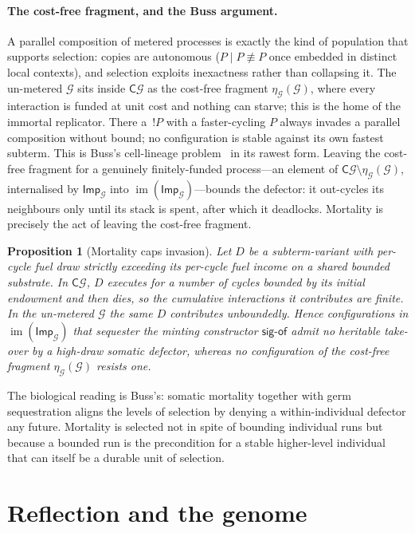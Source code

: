 \documentclass[11pt]{article}
\theoremstyle{plain}
\newtheorem{proposition}{Proposition}
\theoremstyle{definition}
\theoremstyle{remark}
\newcommand{\G}{\mathcal{G}}
\newcommand{\C}{\mathsf{C}}
\newcommand{\sigof}{\mathsf{sig\text{-}of}}
\newcommand{\Imp}{\mathsf{Imp}}
\newcommand{\unit}{\eta}
\begin{document}
\paragraph{The cost-free fragment, and the Buss argument.}
A parallel composition of metered processes is exactly the kind of population
that supports selection: copies are autonomous ($P\mid P\not\equiv P$ once
embedded in distinct local contexts), and selection exploits inexactness rather
than collapsing it. The un-metered $\G$ sits inside $\C\G$ as the cost-free
fragment $\unit_\G(\G)$, where every interaction is funded at unit cost and
nothing can starve; this is the home of the immortal replicator. There a
$\,! P$ with a faster-cycling $P$ always invades a parallel composition without
bound; no configuration is stable against its own fastest subterm. This is
Buss's cell-lineage problem~\cite{buss1987} in its rawest form. Leaving the
cost-free fragment for a genuinely finitely-funded process---an element of
$\C\G\setminus\unit_\G(\G)$, internalised by $\Imp_\G$ into
$\operatorname{im}(\Imp_\G)$---bounds the defector: it out-cycles its neighbours
only until its stack is spent, after which it deadlocks. Mortality is precisely
the act of leaving the cost-free fragment.

\begin{proposition}[Mortality caps invasion]
\label{prop:invasion}
Let $D$ be a subterm-variant with per-cycle fuel draw strictly exceeding its
per-cycle fuel income on a shared bounded substrate. In $\C\G$, $D$ executes for
a number of cycles bounded by its initial endowment and then dies, so the
cumulative interactions it contributes are finite. In the un-metered $\G$ the
same $D$ contributes unboundedly. Hence configurations in
$\operatorname{im}(\Imp_\G)$ that sequester the minting constructor $\sigof$
admit no heritable take-over by a high-draw somatic defector, whereas no
configuration of the cost-free fragment $\unit_\G(\G)$ resists one.
\end{proposition}

The biological reading is Buss's: somatic mortality together with germ
sequestration aligns the levels of selection by denying a within-individual
defector any future. Mortality is selected not in spite of bounding individual
runs but because a bounded run is the precondition for a stable higher-level
individual that can itself be a durable unit of selection.

\section{Reflection and the genome}
\label{sec:genome}
\end{document}
